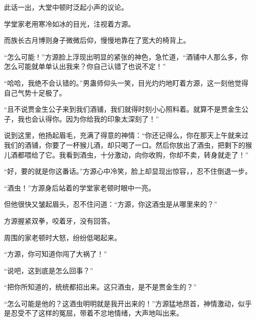 \begin{this_body}
此话一出，大堂中顿时泛起小声的议论。

学堂家老用寒冷如冰的目光，注视着方源。

而族长古月博则身子微微后仰，慢慢地靠在了宽大的椅背上。

“怎么可能！”方源脸上浮现出明显的紧张的神色，急忙道，“酒铺中人那么多，你怎么可能就单单认出我来？你自己认错了也说不定！”

“哈哈，我绝不会认错的。”男蛊师仰头一笑，目光灼灼地盯着方源，这一刻他觉得自己气势十足极了。

“且不说贾金生公子来到我们酒铺，我们就得时刻小心照料着。就算不是贾金生公子，我也会认得你。因为你给我的印象太深刻了！”

说到这里，他扬起眉毛，充满了得意的神情：“你还记得么，你在那天上午就来过我们的酒铺，你要了一杯猴儿酒，却只喝了一口。然后你放出了酒虫，把剩下的猴儿酒都喂给了它。我看到酒虫，十分激动，向你收购，你却不卖，转身就走了！”

“好，要的就是你这番话。”方源心中冷笑，脸上却显现出惊容，，忍不住倒退一步。

“酒虫！”方源身后站着的学堂家老顿时眼中一亮。

但他很快又皱起眉头，忍不住问道：“方源，你这酒虫是从哪里来的？”

方源握紧双拳，咬着牙，没有回答。

周围的家老顿时大怒，纷纷低喝起来。

“方源，你可知道你闯了大祸了！”

“说吧，这到底是怎么回事？”

“把你所知道的，统统都招出来。这只酒虫，是不是贾金生的？”

“怎么可能是他的？这酒虫明明就是我开出来的！”方源猛地昂首，神情激动，似乎是忍受不了这样的冤屈，带着不忿地情绪，大声地叫出来。

\end{this_body}

